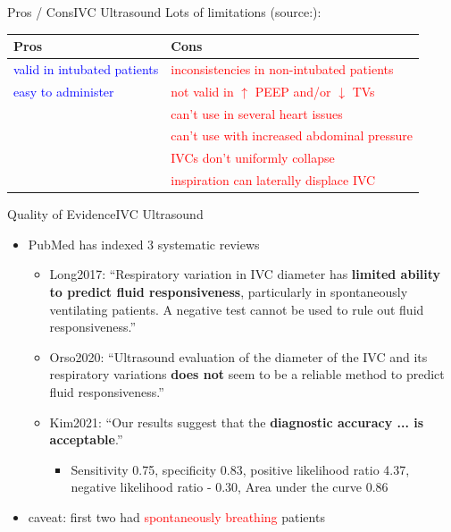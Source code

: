 \documentclass{beamer}
\newcommand{\pro}{\textcolor{blue}}
\newcommand{\con}{\textcolor{red}}
\begin{document}
			\begin{frame}{Pros / Cons}{IVC Ultrasound}
				Lots of limitations (source:\cite{Via2016}):
				\pause
				\begin{center}
					\begin{tabular}{l||l}
						\textbf{Pros} & \textbf{Cons} \\	
						\hline
						\pro{valid in intubated patients} & \con{inconsistencies in non-intubated patients}\\
						\hline
						\pro{easy to administer} & \con{not valid in $\uparrow$ PEEP and/or $\downarrow$ TVs}\\
						\hline
						\pro{} & \con{can't use in several heart issues}\\
						\hline
						\pro{} & \con{can't use with increased abdominal pressure}\\
						\hline
						\pro{} & \con{IVCs don't uniformly collapse}\\
						\hline
						\pro{} & \con{inspiration can laterally displace IVC}
					\end{tabular}
				\end{center}
			\end{frame}
			\begin{frame}{Quality of Evidence}{IVC Ultrasound}
				\begin{itemize}
					\item PubMed has indexed 3 systematic reviews \cite{Long2017,Orso2020,Kim2021}
					\begin{itemize}
						\item Long2017: ``Respiratory variation in IVC diameter has \textbf{limited ability to predict fluid responsiveness}, particularly in spontaneously ventilating patients. A negative test cannot be used to rule out fluid responsiveness.''
						\item Orso2020: ``Ultrasound evaluation of the diameter of the IVC and its respiratory variations \textbf{does not} seem to be a reliable method to predict fluid responsiveness.''
						\item Kim2021: ``Our results suggest that the \textbf{diagnostic accuracy ... is acceptable}.'' 
						\begin{itemize}
							\item Sensitivity 0.75, specificity 0.83, positive likelihood ratio 4.37, negative likelihood ratio - 0.30, Area under the curve 0.86
						\end{itemize}
					\end{itemize}
					\item caveat: first two had \con{spontaneously breathing} patients
				\end{itemize}
			\end{frame}
\end{document}
